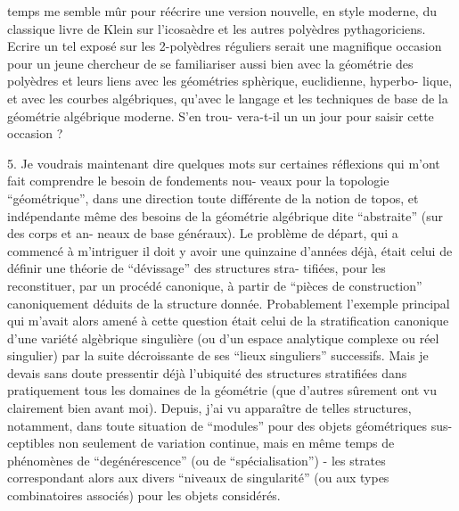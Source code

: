 
temps me semble mûr pour réécrire une version nouvelle, en style
moderne, du classique livre de Klein sur l'icosaèdre et les autres
polyèdres pythagoriciens. Ecrire un tel exposé sur les 2-polyèdres
réguliers serait une magnifique occasion pour un jeune chercheur
de se familiariser aussi bien avec la géométrie des polyèdres et
leurs liens avec les géométries sphèrique, euclidienne, hyperbo-%
lique, et avec les courbes algébriques, qu'avec le langage et les
techniques de base de la géométrie algébrique moderne. S'en trou-%
vera-t-il un un jour pour saisir cette occasion ?

5. \qquad Je voudrais maintenant dire quelques mots sur certaines
réflexions qui m'ont fait comprendre le besoin de fondements nou-%
veaux pour la topologie ``géométrique'', dans une direction toute
différente de la notion de topos, et indépendante même des besoins
de la géométrie algébrique dite ``abstraite'' (sur des corps et an-%
neaux de base généraux). Le problème de départ, qui a commencé à
m'intriguer il doit y avoir une quinzaine d'années déjà, était
celui de définir une théorie de ``dévissage'' des structures stra-%
tifiées, pour les reconstituer, par un procédé canonique, à partir
de ``pièces de construction'' canoniquement déduits de la structure
donnée. Probablement l'exemple principal qui m'avait alors amené
à cette question était celui de la stratification canonique d'une
variété algèbrique singulière (ou d'un espace analytique complexe
ou réel singulier) par la suite décroissante de ses ``lieux singuliers''
successifs. Mais je devais sans doute pressentir déjà l'ubiquité
des structures stratifiées dans pratiquement tous les domaines de
la géométrie (que d'autres sûrement ont vu clairement bien avant
moi). Depuis, j'ai vu apparaître de telles structures, notamment,
dans toute situation de ``modules'' pour des objets géométriques sus-%
ceptibles non seulement de variation continue, mais en même temps
de phénomènes de ``degénérescence'' (ou de ``spécialisation'') - les
strates correspondant alors aux divers ``niveaux de singularité''
(ou aux types combinatoires associés) pour les objets considérés.

